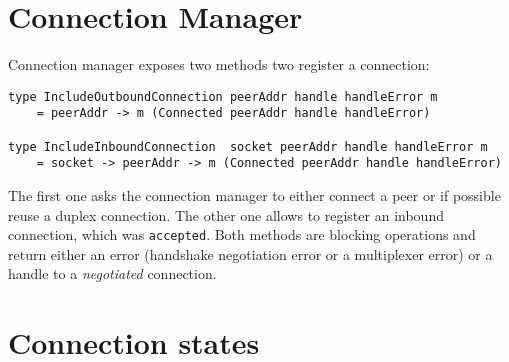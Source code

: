 \documentclass{article}
\begin{document}
\section{Connection Manager}

Connection manager exposes two methods two register a connection:
\begin{lstlisting}
type IncludeOutboundConnection peerAddr handle handleError m
    = peerAddr -> m (Connected peerAddr handle handleError)

type IncludeInboundConnection  socket peerAddr handle handleError m
    = socket -> peerAddr -> m (Connected peerAddr handle handleError)
\end{lstlisting}
The first one asks the connection manager to either connect a peer or if
possible reuse a duplex connection.  The other one allows to register an
inbound connection, which was \texttt{accepted}.  Both methods are blocking
operations and return either an error (handshake negotiation error or
a multiplexer error) or a handle to a \textit{negotiated} connection.


\section{Connection states}
\end{document}
